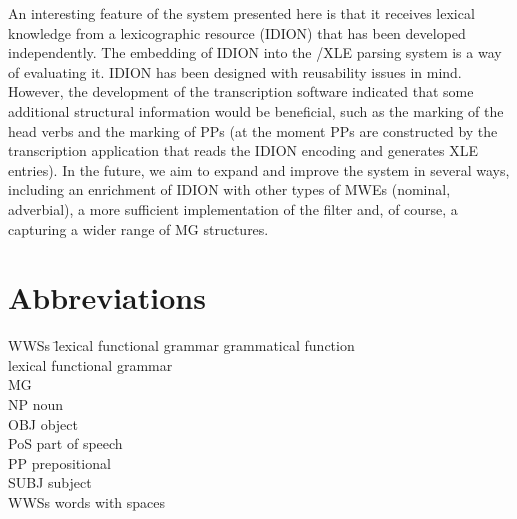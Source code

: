 \documentclass[output=paper]{langsci/langscibook}
\begin{document}
An interesting feature of the system presented here is that it receives lexical knowledge from a lexicographic resource (IDION) that has been developed independently. The embedding of IDION into the /XLE parsing system is a way of evaluating it. IDION has been designed with reusability issues in mind. However, the development of the transcription software indicated that some additional structural information would be beneficial, such as the marking of the head verbs and the marking of PPs (at the moment PPs are constructed by the transcription application that reads the IDION encoding and generates XLE entries). 
%
In the future, we aim to expand and improve the system in several ways, including an enrichment of IDION with other types of MWEs (nominal, adverbial), a more sufficient implementation of the filter and, of course, a  capturing a wider range of MG structures. 

\section*{Abbreviations}
\begin{multicols}{2}
\begin{tabbing}
WWSs \hspace{1em} \= lexical functional grammar\kill
{} \> grammatical function \\
 \> lexical functional grammar \\
MG \>   \\
NP \> noun  \\
OBJ \> object \\
PoS \> part of speech \\
PP \> prepositional  \\
SUBJ \> subject \\
WWSs \> words with spaces \\
\end{tabbing}
\end{multicols}


\end{document}
